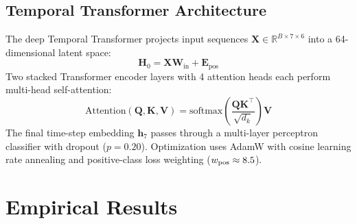 \documentclass[conference]{IEEEtran}
\begin{document}
\subsection{Temporal Transformer Architecture}
The deep Temporal Transformer projects input sequences $\mathbf{X} \in \mathbb{R}^{B \times 7 \times 6}$ into a 64-dimensional latent space:
\begin{equation}
\mathbf{H}_0 = \mathbf{X} \mathbf{W}_{\text{in}} + \mathbf{E}_{\text{pos}}
\end{equation}
Two stacked Transformer encoder layers with 4 attention heads each perform multi-head self-attention:
\begin{equation}
\text{Attention}(\mathbf{Q}, \mathbf{K}, \mathbf{V}) = \text{softmax}\left( \frac{\mathbf{Q}\mathbf{K}^\top}{\sqrt{d_k}} \right) \mathbf{V}
\end{equation}
The final time-step embedding $\mathbf{h}_7$ passes through a multi-layer perceptron classifier with dropout ($p = 0.20$). Optimization uses AdamW with cosine learning rate annealing and positive-class loss weighting ($w_{\text{pos}} \approx 8.5{}$).

\section{Empirical Results}
\label{sec:results}


\end{document}
